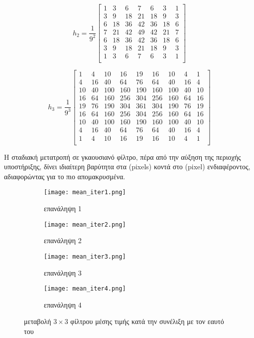\[
h_2 = \dfrac{1}{9^2} 
\begin{bmatrix}
  1 & 3 & 6 & 7 & 6 & 3 & 1\\
  3 & 9 & 18 & 21 & 18 & 9 & 3\\
  6 & 18 & 36 & 42 & 36 & 18 & 6\\
  7 & 21 & 42 & 49 & 42 & 21 & 7\\
  6 & 18 & 36 & 42 & 36 & 18 & 6\\
  3 & 9 & 18 & 21 & 18 & 9 & 3\\
  1 & 3 & 6 & 7 & 6 & 3 & 1\\
 \end{bmatrix}
\]

\[
h_3 = \dfrac{1}{9^3} 
\begin{bmatrix}
  1 & 4 & 10 & 16 & 19 & 16 & 10 & 4 & 1\\
  4 & 16 & 40 & 64 & 76 & 64 & 40 & 16 & 4\\
  10 & 40 & 100 & 160 & 190 & 160 & 100 & 40 & 10\\
  16 & 64 & 160 & 256 & 304 & 256 & 160 & 64 & 16\\
  19 & 76 & 190 & 304 & 361 & 304 & 190 & 76 & 19\\
  16 & 64 & 160 & 256 & 304 & 256 & 160 & 64 & 16\\
  10 & 40 & 100 & 160 & 190 & 160 & 100 & 40 & 10\\
  4 & 16 & 40 & 64 & 76 & 64 & 40 & 16 & 4\\
  1 & 4 & 10 & 16 & 19 & 16 & 10 & 4 & 1\\
\end{bmatrix}
\]

Η σταδιακή μετατροπή σε γκαουσιανό φίλτρο, πέρα από την αύξηση της περιοχής υποστήριξης, δίνει ιδιαίτερη βαρύτητα στα \e(pixels) \g κοντά στο \e(pixel) \g ενδιαφέροντος, αδιαφορώντας για το πιο απομακρυσμένα.

\begin{figure}
	\centering
	\begin{subfigure}{.6\textwidth}
		\texttt{[image: mean\_iter1.png]}
		\caption{επανάληψη 1}
	\end{subfigure}
	\begin{subfigure}{.6\textwidth}
		\texttt{[image: mean\_iter2.png]}
		\caption{επανάληψη 2}
	\end{subfigure}
	\begin{subfigure}{.6\textwidth}
		\texttt{[image: mean\_iter3.png]}
		\caption{επανάληψη 3}
		\label{fig:small_window}
	\end{subfigure}
		\begin{subfigure}{.6\textwidth}
		\texttt{[image: mean\_iter4.png]}
		\caption{επανάληψη 4}
		\label{fig:large_window}
	\end{subfigure}
	\caption{μεταβολή $3\times3$ φίλτρου μέσης τιμής κατά την συνέλιξη με τον εαυτό του}
	\label{fig:mean_filter_iterations}
\end{figure}
